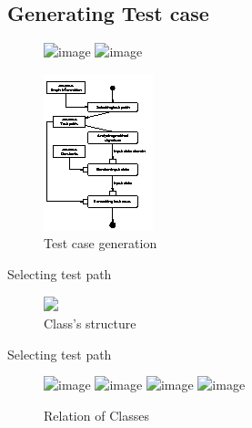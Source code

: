 \documentclass{beamer}
\begin{document}
\subsection{Generating Test case}
\begin{frame}
    \begin{figure}
        \includegraphics<1>[height=0.8\paperheight]{figure/Methodology}
        \includegraphics<2>[height=0.8\paperheight]{figure/Methodology-Highlight-1}
    \end{figure}
\end{frame}

\begin{frame}
    \begin{figure}
        \includegraphics[height=.8\paperheight]{figure/Activities}
        \caption{Test case generation}
        \label{fig:testcasegenearation}
    \end{figure}
\end{frame}

\begin{frame}{Selecting test path}
    \begin{figure}
        \includegraphics<1>[width=.8\paperwidth]{figure/psuedo-classes-connection}
        \caption{Class's structure}
        \label{fig:classStructure}
    \end{figure}
\end{frame}

\begin{frame}{Selecting test path}
    \begin{figure}
        \includegraphics<1>[width=.8\paperwidth]{figure/Relationship-between-Classes}
        \includegraphics<2>[width=.8\paperwidth]{figure/3rd-test-path}
        \includegraphics<3>[width=.8\paperwidth]{figure/2nd-test-path}
        \includegraphics<4>[width=.8\paperwidth]{figure/1st-test-path}
        \caption{Relation of Classes}
        \label{fig:relationOfClassInSCGForm}
    \end{figure}
\end{frame}
\end{document}
